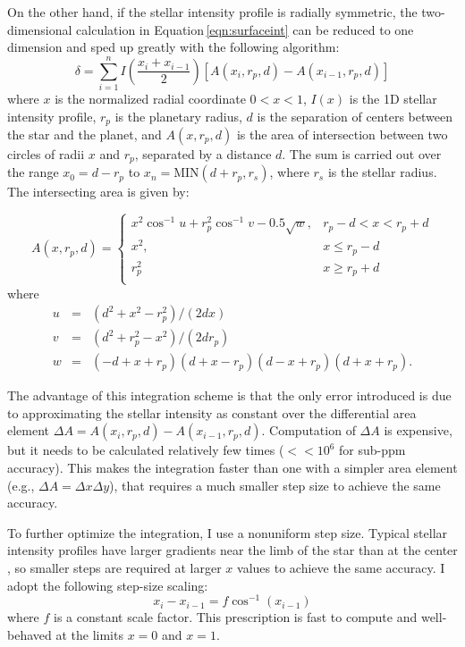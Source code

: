 \documentclass[12pt,preprint]{aastex}
\begin{document}
On the other hand, if the stellar intensity profile is radially symmetric, the two-dimensional calculation in Equation\,\ref{eqn:surfaceint} can be reduced to one dimension and sped up greatly with the following algorithm: 
\begin{equation}
\delta = \sum_{i=1}^{n} I\left(\frac{x_i+x_{i-1}}{2}\right) \left[A(x_{i}, r_p, d) - A(x_{i-1}, r_p, d)\right]
\end{equation}
where $x$ is the normalized radial coordinate $0 < x < 1$, $I(x)$ is the 1D stellar intensity profile, $r_p$ is the planetary radius, $d$ is the separation of centers between the star and the planet, and $A(x, r_p, d)$ is the area of intersection between two circles of radii $x$ and $r_p$, separated by a distance $d$.  The sum is carried out over the range $x_0 = d - r_p$ to $x_n = \textrm{MIN}(d + r_p, r_s)$, where $r_s$ is the stellar radius.  The intersecting area is given by:

\begin{equation}
A(x, r_p, d) = 
\begin{cases}
x^2\cos^{-1}{u} + r_p^2\cos^{-1}{v} - 0.5\sqrt{w}, & r_p -d < x < r_p + d\\
x^2, & x \le r_p - d\\
r_p^2 & x \ge r_p +d \\
\end{cases}
\end{equation}
where
\begin{eqnarray}
u &=& (d^2+x^2-r_p^2)/(2dx)\\
v &=& (d^2 + r_p^2 -x^2)/(2dr_p) \\
w &=& (-d+x+r_p)(d+x-r_p)(d-x+r_p)(d+x+r_p).
\end{eqnarray}

The advantage of this integration scheme is that the only error introduced is due to approximating the stellar intensity as constant over the differential area element $\Delta A = A(x_i, r_p, d) - A(x_{i-1}, r_p, d)$.  Computation of $\Delta A$ is expensive, but it needs to be calculated relatively few times ($<<10^{6}$ for sub-ppm accuracy). This makes the integration faster than one with a simpler area element (e.g., $\Delta A = \Delta x \Delta y$), that requires a much smaller step size to achieve the same accuracy.

To further optimize the integration, I use a nonuniform step size.  Typical stellar intensity profiles have larger gradients near the limb of the star than at the center \citep[e.g.][]{claret00}, so smaller steps are required at larger $x$ values to achieve the same accuracy.  I adopt the following step-size scaling: 
$$
x_i - x_{i-1}  = f\cos^{-1}\left(x_{i-1}\right)
$$  
where $f$ is a constant scale factor. This prescription is fast to compute and well-behaved at the limits $x=0$ and $x=1$.
\end{document}
